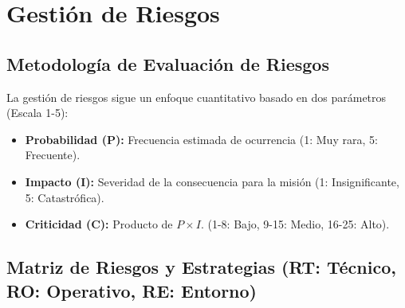 \section{Gestión de Riesgos}

\subsection{Metodología de Evaluación de Riesgos}
La gestión de riesgos sigue un enfoque cuantitativo basado en dos parámetros (Escala 1-5):
\begin{itemize}
    \item \textbf{Probabilidad (P):} Frecuencia estimada de ocurrencia (1: Muy rara, 5: Frecuente).
    \item \textbf{Impacto (I):} Severidad de la consecuencia para la misión (1: Insignificante, 5: Catastrófica).
    \item \textbf{Criticidad (C):} Producto de $P \times I$. (1-8: Bajo, 9-15: Medio, 16-25: Alto).
\end{itemize}

\subsection{Matriz de Riesgos y Estrategias (RT: Técnico, RO: Operativo, RE: Entorno)}

